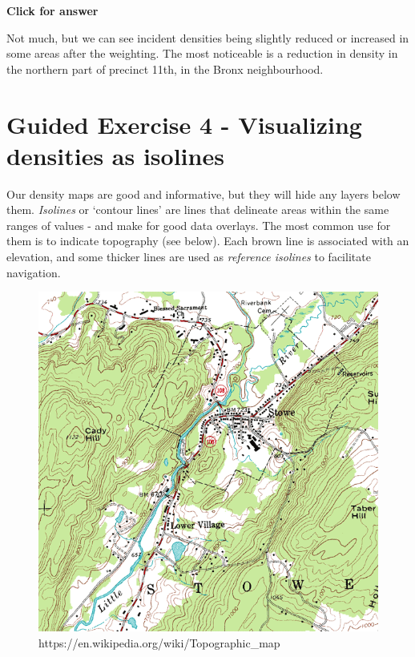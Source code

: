 \documentclass[
  letterpaper,
  DIV=11,
  numbers=noendperiod]{scrreprt}
\begin{document}
\begin{tcolorbox}[enhanced jigsaw, toprule=.15mm, breakable, left=2mm, colframe=quarto-callout-important-color-frame, colback=white, arc=.35mm, leftrule=.75mm, opacityback=0, rightrule=.15mm, bottomrule=.15mm]

\vspace{-3mm}\textbf{Click for answer}\vspace{3mm}

Not much, but we can see incident densities being slightly reduced or
increased in some areas after the weighting. The most noticeable is a
reduction in density in the northern part of precinct 11th, in the Bronx
neighbourhood.

\end{tcolorbox}

\section{Guided Exercise 4 - Visualizing densities as
isolines}\label{guided-exercise-4---visualizing-densities-as-isolines}

Our density maps are good and informative, but they will hide any layers
below them. \emph{Isolines} or `contour lines' are lines that delineate
areas within the same ranges of values - and make for good data
overlays. The most common use for them is to indicate topography (see
below). Each brown line is associated with an elevation, and some
thicker lines are used as \emph{reference isolines} to facilitate
navigation.

\begin{figure}[H]

{\centering \includegraphics{index_files/mediabag/Topographic_map_exam.png}

}

\caption{https://en.wikipedia.org/wiki/Topographic\_map}

\end{figure}%
\end{document}
